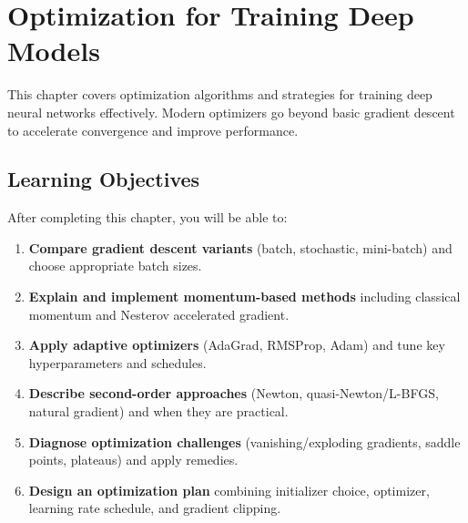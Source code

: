 
\chapter{Optimization for Training Deep Models}
\label{chap:optimization}

This chapter covers optimization algorithms and strategies for training deep neural networks effectively. Modern optimizers go beyond basic gradient descent to accelerate convergence and improve performance.

\section*{Learning Objectives}
\label{sec:ch8-learning-objectives}

After completing this chapter, you will be able to:

\begin{enumerate}
    \item \textbf{Compare gradient descent variants} (batch, stochastic, mini-batch) and choose appropriate batch sizes.
    \item \textbf{Explain and implement momentum-based methods} including classical momentum and Nesterov accelerated gradient.
    \item \textbf{Apply adaptive optimizers} (AdaGrad, RMSProp, Adam) and tune key hyperparameters and schedules.
    \item \textbf{Describe second-order approaches} (Newton, quasi-Newton/L-BFGS, natural gradient) and when they are practical.
    \item \textbf{Diagnose optimization challenges} (vanishing/exploding gradients, saddle points, plateaus) and apply remedies.
    \item \textbf{Design an optimization plan} combining initializer choice, optimizer, learning rate schedule, and gradient clipping.
\end{enumerate}













